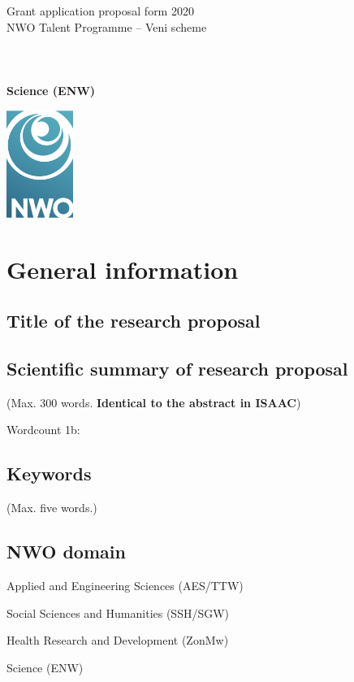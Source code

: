\documentclass[10pt]{article}
\newcommand{\cmark}{\ding{51}}%
\newcommand{\done}{\rlap{\color{sectionblue}$\square$}{\raisebox{2pt}{\large\hspace{1pt}\cmark}}\hspace{-2.5pt}}
\begin{document}
	
	\noindent
	\begin{minipage}{.85\linewidth}
		\color{headerblue}
		{\rmfamily\fontsize{20}{20}\selectfont Grant application proposal form 2020}\\[0.3cm]
		{\rmfamily\fontsize{15}{15}\selectfont NWO Talent Programme -- Veni scheme}\\[0.25cm]
		{\rmfamily\fontsize{11}{11}\selectfont
		\\ %
		\\ %
		\\ %
		\textbf{Science (ENW)}
		}
	\end{minipage}%
	\begin{minipage}{.15\linewidth}
		\includegraphics[height=3.5cm]{NWO_logo}
	\end{minipage}
	
	\section{General information}
	
	\subsection{Title of the research proposal}
	
	\vfill 
	
	\subsection{Scientific summary of research proposal}
	(Max. 300 words. \textbf{Identical to the abstract in ISAAC}) 
	
	\vfill
	
	Wordcount 1b: 
	
	\subsection{Keywords}
	(Max. five words.) 
	
	\vfill
	
	\subsection{NWO domain}
	\begin{todolist}
		\setlength\itemsep{0em}
		\item Applied and Engineering Sciences (AES/TTW)
		\item Social Sciences and Humanities (SSH/SGW)
		\item Health Research and Development (ZonMw)
		\item[\done] Science (ENW)
	\end{todolist}
	
\end{document}
